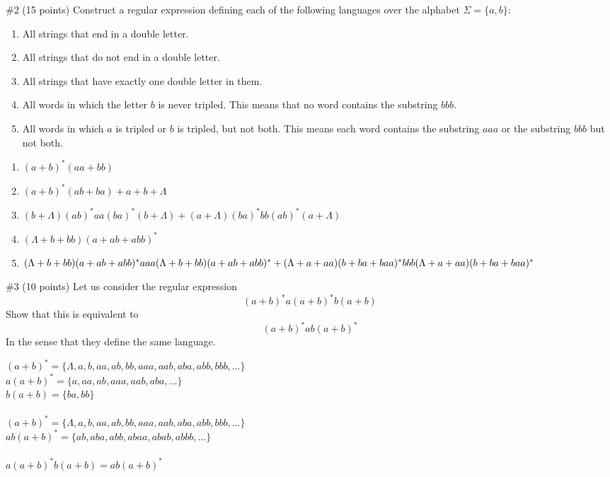 \begin{problem}{\#2 (15 points)}
    Construct   a   regular   expression   defining   each   of   the following languages over the alphabet \(\Sigma=\{a,b\}\):
    \begin{enumerate}[label=\alph*)]
        \item All strings that end in a double letter.
        \item All strings that do not end in a double letter.
        \item All strings that have exactly one double letter in them.
        \item All words in which the letter \(b\) is never tripled. This means that no word contains the substring \(bbb\).
        \item All words in which \(a\) is tripled or \(b\) is tripled, but not both. This means each word contains the substring \(aaa\) or the substring \(bbb\) but not both.
    \end{enumerate}
\end{problem}
\vspace{2em}
\begin{solution}
    \begin{enumerate}[label=\alph*)]
        \item \((a+b)^*(aa+bb)\)
        \item \((a+b)^*(ab+ba)+a+b+\Lambda\)
        \item \((b+\Lambda)(ab)^*aa(ba)^*(b+\Lambda) + (a+\Lambda)(ba)^*bb(ab)^*(a+\Lambda)\)
        \item \((\Lambda+b+bb)(a+ab+abb)^*\)
        \item \((\Lambda+b+bb)(a+ab+abb)^*aaa(\Lambda+b+bb)(a+ab+abb)^*+\\(\Lambda+a+aa)(b+ba+baa)^*bbb(\Lambda+a+aa)(b+ba+baa)^*\)
    \end{enumerate}
\end{solution}

\begin{problem}{\#3 (10 points)}
    Let us consider the regular expression
    \[(a+b)^*a(a+b)^*b(a+b)\]
    Show that this is equivalent to
    \[(a+b)^*ab(a+b)^*\]
    In the sense that they define the same language.
\end{problem}
\vspace{2em}
\begin{solution}
    \((a+b)^*=\{\Lambda,a,b,aa,ab,bb,aaa,aab,aba,abb,bbb,\ldots\}\)\\
    \(a(a+b)^* = \{a,aa,ab,aaa,aab,aba,\ldots\}\)\\
    \(b(a+b) = \{ba,bb\}\)\\
    \\
    \((a+b)^* = \{\Lambda,a,b,aa,ab,bb,aaa,aab,aba,abb,bbb,\ldots\}\)\\
    \(ab(a+b)^* = \{ab,aba,abb,abaa,abab,abbb,\ldots\}\)\\
    \\
    \(a(a+b)^*b(a+b) = ab(a+b)^*\)
\end{solution}

